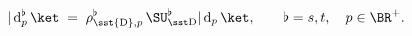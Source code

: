 \begin{equation}\label{eigenans}
|\,{\rm d}^{\flat}_p\,\ket\;=\;\rho_{\sst{\rm D},p}^{\flat}\,
\SU_{\rm\sst D}^{\flat}
|\,{\rm d}_p\,\ket,\qquad
\flat=s,t,\quad p\in\BR^+.
\end{equation}

